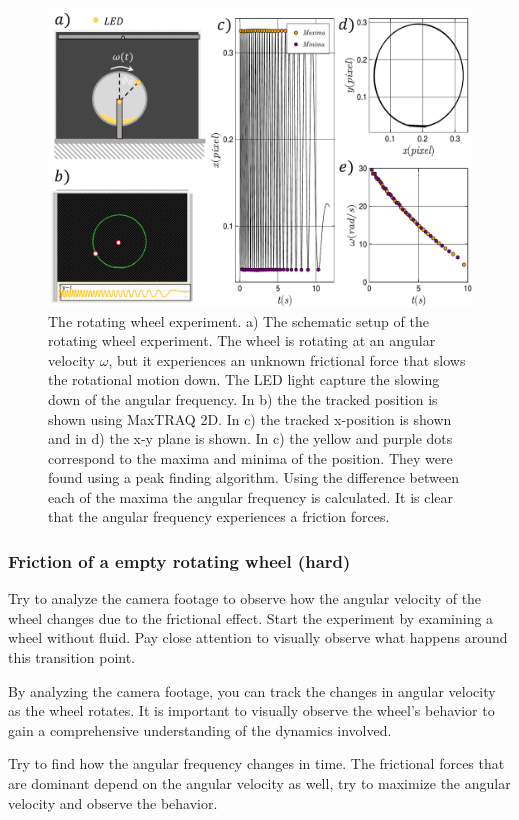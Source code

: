 \documentclass{article}
\begin{document}
\begin{figure}
    \centering
    \includegraphics[width=12cm]{figures/Rotating Wheel.pdf}
    \caption{The rotating wheel experiment. a) The schematic setup of the rotating wheel experiment. The wheel is rotating at an angular velocity $\omega$, but it experiences an unknown frictional force that slows the rotational motion down. The LED light capture the slowing down of the angular frequency. In b) the the tracked position is shown using MaxTRAQ 2D. In c) the tracked x-position is shown and in d) the x-y plane is shown. In c) the yellow and purple dots correspond to the maxima and minima of the position. They were found using a peak finding algorithm. Using the difference between each of the maxima the angular frequency is calculated. It is clear that the angular frequency experiences a friction forces.}
    \label{Fig. Rotating Wheel}
\end{figure}

\subsubsection{Friction of a empty rotating wheel (hard)}
Try to analyze the camera footage to observe how the angular velocity of the wheel changes due to the frictional effect. Start the experiment by examining a wheel without fluid. Pay close attention to visually observe what happens around this transition point.

By analyzing the camera footage, you can track the changes in angular velocity as the wheel rotates. It is important to visually observe the wheel's behavior to gain a comprehensive understanding of the dynamics involved.

Try to find how the angular frequency changes in time. The frictional forces that are dominant depend on the angular velocity as well, try to maximize the angular velocity and observe the behavior. 
\end{document}
